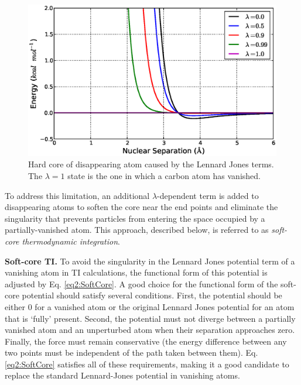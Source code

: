 \begin{figure}
   \includegraphics[width=6.5in]{HardCore.ps}
   \caption{Hard core of disappearing atom caused by the Lennard Jones terms.
            The $\lambda = 1$ state is the one in which a carbon atom has
            vanished.}
   \label{fig2:HardCore}
\end{figure}

To address this limitation, an additional $\lambda$-dependent term is added to
disappearing atoms to soften the core near the end points and eliminate the
singularity that prevents particles from entering the space occupied by a
partially-vanished atom. This approach, described below, is referred to as
\emph{soft-core thermodynamic integration}.

\textbf{Soft-core TI.} To avoid the singularity in the Lennard Jones potential
term of a vanishing atom in TI calculations, the functional form of this
potential is adjusted by Eq.  \ref{eq2:SoftCore}. A good choice for the
functional form of the soft-core potential should satisfy several conditions.
First, the potential should be either 0 for a vanished atom or the original
Lennard Jones potential for an atom that is `fully' present. Second, the
potential must not diverge between a partially vanished atom and an unperturbed
atom when their separation approaches zero.  Finally, the force must remain
conservative (\ie the energy difference between any two points must be
independent of the path taken between them). Eq.  \ref{eq2:SoftCore} satisfies
all of these requirements, making it a good candidate to replace the standard
Lennard-Jones potential in vanishing atoms.

